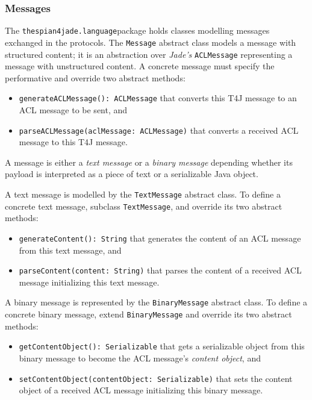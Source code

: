 \subsubsection{Messages}

The \texttt{thespian4jade.language}package holds classes modelling messages exchanged in the protocols.
The \texttt{Message} abstract class models a message with structured content; it is an abstraction over \textit{Jade's} \texttt{ACLMessage} representing a message with unstructured content.
A concrete message must specify the performative and override two abstract methods:
\begin{itemize}
	\item \texttt{generateACLMessage(): ACLMessage} that converts this T4J message to an ACL message to be sent, and
	\item \texttt{parseACLMessage(aclMessage: ACLMessage)} that converts a received ACL message to this T4J message.
\end{itemize}

A message is either a \textit{text message} or a \textit{binary message} depending whether its payload is interpreted as a piece of text or a serializable Java object.

A text message is modelled by the \texttt{TextMessage} abstract class.
To define a concrete text message, subclass \texttt{TextMessage}, and override its two abstract methods:
\begin{itemize}
	\item \texttt{generateContent(): String} that generates the content of an ACL message from this text message, and
	\item \texttt{parseContent(content: String)} that parses the content of a received ACL message initializing this text message.
\end{itemize}

A binary message is represented by the \texttt{BinaryMessage} abstract class.
To define a concrete binary message, extend \texttt{BinaryMessage} and override its two abstract methods:
\begin{itemize}
	\item \texttt{getContentObject(): Serializable} that gets a serializable object from this binary message to become the ACL message's \textit{content object}, and
	\item \texttt{setContentObject(contentObject: Serializable)} that sets the content object of a received ACL message initializing this binary message.
\end{itemize}

